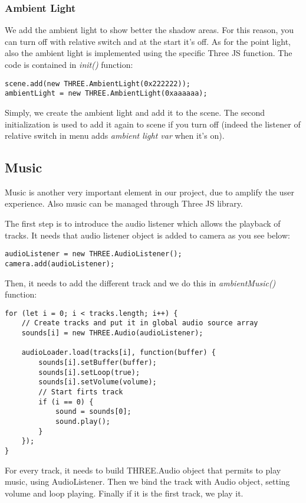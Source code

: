 \documentclass{article}
\begin{document}
\subsubsection{Ambient Light}
We add the ambient light to show better the shadow areas. For this reason, you can turn off with relative switch and at the start it's off. As for the point light, also the ambient light is implemented using the specific Three JS function\cite{documentation:threejs}. The code is contained in \textit{init()} function:
\begin{lstlisting}
scene.add(new THREE.AmbientLight(0x222222));
ambientLight = new THREE.AmbientLight(0xaaaaaa);
\end{lstlisting}
Simply, we create the ambient light and add it to the scene. The second initialization is used to add it again to scene if you turn off (indeed the listener of relative switch in menu adds \textit{ambient light var} when it's on).

\subsection{Music}
Music is another very important element in our project, due to amplify the user experience. Also music can be managed through Three JS library.
\par The first step is to introduce the audio listener which allows the playback of tracks. It needs that audio listener object is added to camera as you see below:
\begin{lstlisting}
audioListener = new THREE.AudioListener();
camera.add(audioListener);
\end{lstlisting}
\par Then, it needs to add the different track and we do this in \textit{ambientMusic()} function:
\begin{lstlisting}
for (let i = 0; i < tracks.length; i++) {
	// Create tracks and put it in global audio source array
	sounds[i] = new THREE.Audio(audioListener);
	
	audioLoader.load(tracks[i], function(buffer) {
		sounds[i].setBuffer(buffer);
		sounds[i].setLoop(true);
		sounds[i].setVolume(volume);
		// Start firts track
		if (i == 0) {
			sound = sounds[0];
			sound.play();
		}
	});
}
\end{lstlisting}
For every track, it needs to build THREE.Audio object that permits to play music, using AudioListener. Then we bind the track with Audio object, setting volume and loop playing. Finally if it is the first track, we play it.
\end{document}
